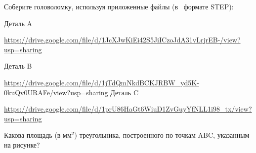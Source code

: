 
Соберите головоломку, используя приложенные файлы (в  формате STEP):

Деталь A

\url{https://drive.google.com/file/d/1JcXJwKiEi42S5JiICzoJdA31vLrjrEB-/view?usp=sharing}

Деталь B

\url{https://drive.google.com/file/d/1jTdQmNkdBCKJRBW_yd5K-0kuQv0URAFe/view?usp=sharing}
Деталь C

\url{https://drive.google.com/file/d/1prU86HaGt6WiuD1ZvGuyYfNLL1i98_tx/view?usp=sharing}


Какова площадь (в мм$^2$) треугольника, построенного по точкам ABC, указанным на рисунке?